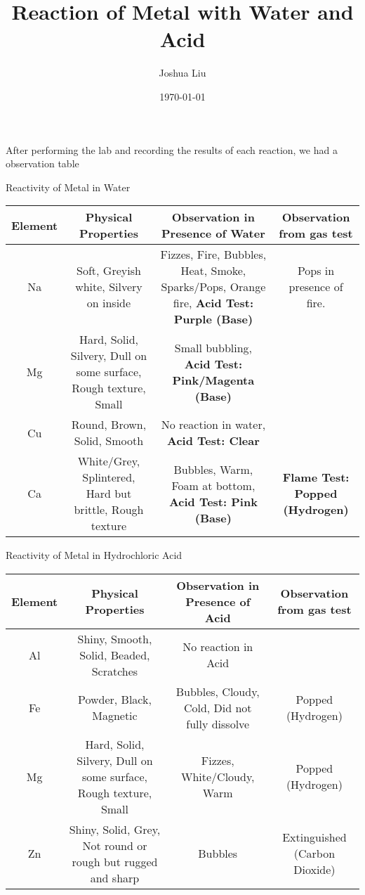\documentclass[12pt]{article}
\title{Reaction of Metal with Water and Acid}
\author{Joshua Liu}
\date{\today}
\begin{document}
    \maketitle
    After performing the lab and recording the results of each reaction, we had a observation table

    \begin{center}
        Reactivity of Metal in Water
    \end{center}
    \scriptsize
    \settowidth{}
    \begin{tabulary}{\linewidth}{C|C|C|C}
        Element&Physical Properties&Observation in Presence of Water&Observation from gas test \\
        \hline
        \hline
        Na & Soft, Greyish white, Silvery on inside & Fizzes, Fire, Bubbles, Heat, Smoke, Sparks/Pops, Orange fire, \textbf{Acid Test: Purple (Base)} & Pops in presence of fire.\\
        Mg & Hard, Solid, Silvery, Dull on some surface, Rough texture, Small & Small bubbling, \textbf{Acid Test: Pink/Magenta (Base)} & \\
        Cu & Round, Brown, Solid, Smooth & No reaction in water, \textbf{Acid Test: Clear} & \\
        Ca & White/Grey, Splintered, Hard but brittle, Rough texture & Bubbles, Warm, Foam at bottom, \textbf{Acid Test: Pink (Base)}& \textbf{Flame Test: Popped (Hydrogen)}\\
    \end{tabulary}

    \normalsize
    \begin{center}
        Reactivity of Metal in Hydrochloric Acid
    \end{center}
    \scriptsize
    \settowidth{}
    \begin{tabulary}{\linewidth}{C|C|C|C}
        Element&Physical Properties&Observation in Presence of Acid&Observation from gas test \\
        \hline
        \hline
        Al & Shiny, Smooth, Solid, Beaded, Scratches & No reaction in Acid & \\
        Fe & Powder, Black, Magnetic & Bubbles, Cloudy, Cold, Did not fully dissolve & Popped (Hydrogen) \\
        Mg & Hard, Solid, Silvery, Dull on some surface, Rough texture, Small & Fizzes, White/Cloudy, Warm & Popped (Hydrogen) \\
        Zn & Shiny, Solid, Grey, Not round or rough but rugged and sharp & Bubbles & Extinguished (Carbon Dioxide)\\
    \end{tabulary}
    
\end{document}
